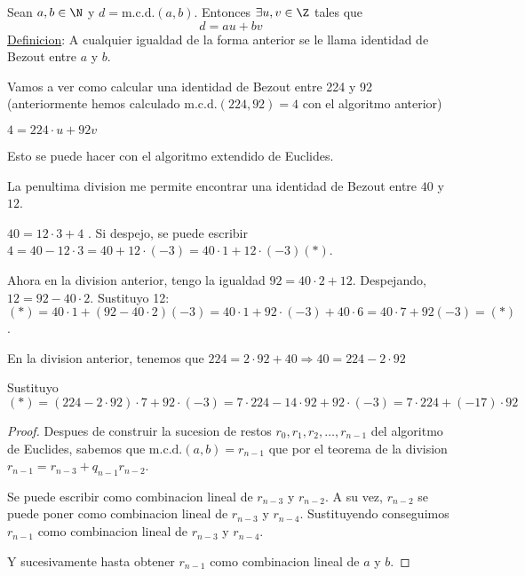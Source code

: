\begin{theorem}
	Sean \(a,b \in \N \) y \(d = \mathrm{m.c.d.}(a,b) \). Entonces \(\exists u,v \in \Z \) tales que
	\[
		d = au + bv
	\]
	\underline{Definicion}: A cualquier igualdad de la forma anterior se le llama identidad de Bezout entre \(a \) y \(b \).
\end{theorem}

\begin{example}
	Vamos a ver como calcular una identidad de Bezout entre 224 y 92 (anteriormente hemos calculado \(\mathrm{m.c.d.}(224,92) = 4	 \) con el algoritmo anterior)

	\(4 = 224 \cdot u + 92 v \)

	Esto se puede hacer con el algoritmo extendido de Euclides.

	La penultima division me permite encontrar una identidad de Bezout entre \(40 \) y \(12 \).

	\(40 = 12 \cdot 3 + 4 \) . Si despejo, se puede escribir \(4 = 40 - 12 \cdot 3 = 40 + 12 \cdot (-3) = 40 \cdot 1 + 12 \cdot (-3) (*)\).

	Ahora en la division anterior, tengo la igualdad \(92 = 40 \cdot 2 + 12 \). Despejando, \(12 = 92 - 40 \cdot 2 \). Sustituyo 12: \((*) = 40 \cdot 1 + (92 - 40 \cdot 2)(-3) = 40 \cdot 1 + 92 \cdot (-3) + 40 \cdot 6 = 40 \cdot 7 + 92 (-3) = (*)\).

	En la division anterior, tenemos que \(224 = 2 \cdot 92 + 40 \Rightarrow 40 = 224 - 2 \cdot 92\)

	Sustituyo
	\[
		(*) = (224 - 2 \cdot 92) \cdot 7 + 92 \cdot (-3) = 7 \cdot 224 - 14 \cdot 92 + 92 \cdot (-3) = 7 \cdot 224 + (-17) \cdot 92
	\]
\end{example}

\begin{proof}
	Despues de construir la sucesion de restos \(r_0, r_1, r_2, \ldots, r_{n-1 }\) del algoritmo de Euclides, sabemos que \(\mathrm{m.c.d.}(a,b) = r_{n-1} \) que por el teorema de la division \(r_{n-1} = r_{n-3} + q_{n-1} r_{n-2}\).

	Se puede escribir como combinacion lineal de \(r_{n-3} \) y \(r_{n-2}\). A su vez, \(r_{n-2 }\) se puede poner como combinacion lineal de \(r_{n-3}\) y \(r_{n-4}\). Sustituyendo conseguimos \(r_{n-1}\) como combinacion lineal de \(r_{n-3}\) y \(r_{n-4}\).

	Y sucesivamente hasta obtener \(r_{n-1}\) como combinacion lineal de \(a \) y \(b \).
\end{proof}

